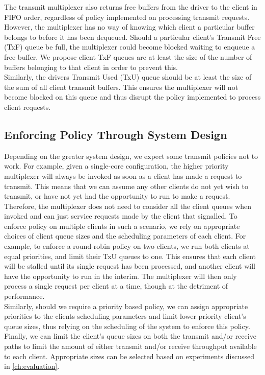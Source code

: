 The transmit multiplexer also returns
free buffers from the driver to the client in FIFO order, regardless of policy implemented on
processing transmit requests. However, the multiplexer has no way of knowing which client
a particular buffer belongs to before it has been dequeued. Should a particular client's 
Transmit Free (TxF) queue be full, the multiplexer could become blocked waiting to enqueue
a free buffer. We propose client TxF queues are at least 
the size of the number of buffers belonging to that client in order to prevent this. \\ 
Similarly, the drivers Transmit Used (TxU) queue should be at least the size of the sum of 
all client transmit buffers. This ensures the multiplexer will not become blocked on this queue
and thus disrupt the policy implemented to process client requests. \\ 

\subsection{Enforcing Policy Through System Design}
Depending on the greater system design, we expect some transmit policies not to work.
For example, given a single-core configuration, the higher priority multiplexer will
always be invoked as soon as a client has made a request to transmit. This means that
we can assume any other clients do not yet wish to transmit, or have not yet had the
opportunity to run to make a request. Therefore, the multiplexer does not need to 
consider all the client queues when invoked and can just service requests made
by the client that signalled. To enforce policy on multiple clients in such a scenario,
we rely on appropriate choices of client queue sizes and the scheduling parameters
of each client. For example, to enforce a round-robin policy on two clients, we run both clients
at equal priorities, and limit their TxU queues to one. This ensures
that each client will be stalled until its single request has been processed, and
another client will have the opportunity to run in the interim. The multiplexer will
then only process a single request per client at a time, though at the detriment of performance.\\
Similarly, should we require a priority based policy, we can assign appropriate priorities
to the clients scheduling parameters and limit lower priority client's queue sizes, thus relying on the scheduling
of the system to enforce this policy.\\
Finally, we can limit the client's queue sizes on both the transmit and/or receive paths
to limit the amount of either transmit and/or receive throughput available to each client.
Appropriate sizes can be selected based on experiments discussed in \autoref{ch:evaluation}.\\ 


